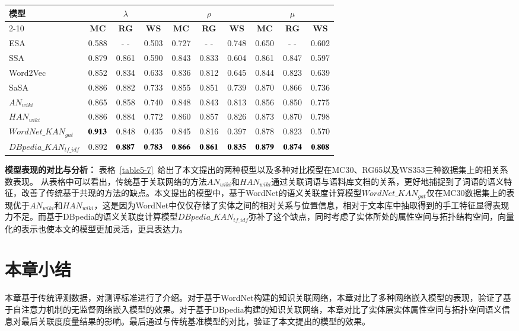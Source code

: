 \begin{table*}[htbp]
    \center
    \vspace{5pt}
    \begin{tabular}{|l|c|c|c|c|c|c|c|c|c|}
    \hline
    \multirow{2}{*}{模型} & \multicolumn{3}{c|}{$\lambda$}     & \multicolumn{3}{c|}{$\rho$}          & \multicolumn{3}{c|}{$\mu$} \\ \cline{2-10} 
                           & \textbf{MC}&\textbf{RG}&\textbf{WS} & \textbf{MC}&\textbf{RG}&\textbf{WS} & \textbf{MC}&\textbf{RG}&\textbf{WS}\\ \hline
    ESA                    & 0.588 &  - -  & 0.503 & 0.727 &  - -  & 0.748 & 0.650 &  - - & 0.602    \\ \hline
    SSA                    & 0.879 & 0.861 & 0.590 & 0.843 & 0.833 & 0.604 & 0.861 & 0.847 & 0.597   \\ \hline
    Word2Vec               & 0.852 & 0.834 & 0.633 & 0.836 & 0.812 & 0.645 & 0.844 & 0.823 & 0.639   \\ \hline
    SaSA                   & 0.886 & 0.882 & 0.733 & 0.855 & 0.851 & 0.739 & 0.870 & 0.866 & 0.736   \\ \hline
    $AN_{wiki}$            & 0.865 & 0.858 & 0.740 & 0.848 & 0.843 & 0.813 & 0.856 & 0.850 & 0.775   \\ \hline
    $HAN_{wiki}$           & 0.886 & 0.884 & 0.772 & 0.860 & 0.857 & 0.826 & 0.873 & 0.870 & 0.798   \\ \hline
    $WordNet\_KAN_{gat}$   & $\bf 0.913$ & 0.848 & 0.435 & 0.845 & 0.816 & 0.397 & 0.878  & 0.823 & 0.570 \\ \hline
    $DBpedia\_KAN_{tf\_idf}$        & 0.892 & $\bf 0.887$ & $\bf 0.783$ & $\bf 0.866$ & $\bf 0.861$ & $\bf 0.835$ & $\bf 0.879$ & $\bf 0.874$ & $\bf 0.808$ \\ \hline
    \end{tabular}
    \label{table5-7}
\end{table*}

\textbf{模型表现的对比与分析：}
表格~\ref{table5-7}~给出了本文提出的两种模型以及多种对比模型在MC30、RG65以及WS353三种数据集上的相关系数表现。
从表格中可以看出，传统基于关联网络的方法$AN_{wiki}$和$HAN_{wiki}$通过关联词语与语料库文档的关系，更好地捕捉到了词语的语义特征，改善了传统基于共现的方法的缺点。本文提出的模型中，基于WordNet的语义关联度计算模型$WordNet\_KAN_{gat}$仅在MC30数据集上的表现优于$AN_{wiki}$和$HAN_{wiki}$，这是因为WordNet中仅仅存储了实体之间的相对关系与位置信息，相对于文本库中抽取得到的手工特征显得表现力不足。而基于DBpedia的语义关联度计算模型$DBpedia\_KAN_{tf\_idf}$弥补了这个缺点，同时考虑了实体所处的属性空间与拓扑结构空间，向量化的表示也使本文的模型更加灵活，更具表达力。


\section{本章小结}
本章基于传统评测数据，对测评标准进行了介绍。对于基于WordNet构建的知识关联网络，本章对比了多种网络嵌入模型的表现，验证了基于自注意力机制的无监督网络嵌入模型的效果。对于基于DBpedia构建的知识关联网络，本章对比了实体层实体属性空间与拓扑空间语义信息对最后关联度度量结果的影响。最后通过与传统基准模型的对比，验证了本文提出的模型的效果。
